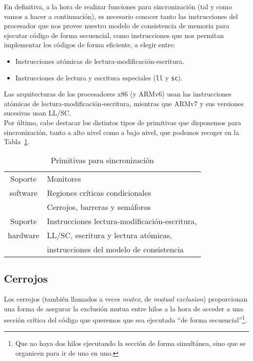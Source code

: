 En definitiva, a la hora de realizar funciones para sincronización (tal y como vamos a hacer a continuación), es necesario conocer tanto las instrucciones del procesador que nos provee nuestro modelo de consistencia de memoria para ejecutar código de forma secuencial, como instrucciones que nos permitan implementar los códigos de forma eficiente, a elegir entre:
\begin{itemize}
    \item Instrucciones atómicas de lectura-modificación-escritura.
    \item Instrucciones de lectura y escritura especiales (\verb|ll| y \verb|sc|).
\end{itemize}
Las arquitecturas de los procesadores x86 (y ARMv6) usan las instrucciones atómicas de lectura-modificación-escritura, mientras que ARMv7 y sus versiones sucesivas usan LL/SC.\\

Por último, cabe destacar los distintos tipos de primitivas que disponemos para sincronización, tanto a alto nivel como a bajo nivel, que podemos recoger en la Tabla~\ref{tab:primitivas_sinc}.
\begin{table}[H]
\centering
\begin{tabular}{cl}
    Soporte & Monitores \\
    software & Regiones críticas condicionales \\
             & Cerrojos, barreras y semáforos \\
    \toprule
    Suporte & Instrucciones lectura-modificación-escritura, \\
    hardware & LL/SC, escritura y lectura atómicas, \\
             & instrucciones del modelo de consistencia
\end{tabular}
\caption{Primitivas para sincronización}
\label{tab:primitivas_sinc}
\end{table}

\subsection{Cerrojos}
Los cerrojos (también llamados a veces \emph{mutex}, de \emph{mutual exclusion}) proporcionan una forma de asegurar la exclusión mutua entre hilos a la hora de acceder a una sección crítica del código que queremos que sea ejecutada ``de forma secuencial''\footnote{Que no haya dos hilos ejecutando la sección de forma simultánea, sino que se organicen para ir de uno en uno.}. 

